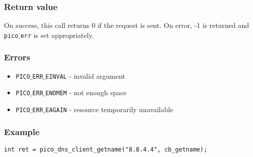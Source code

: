 \subsubsection*{Return value}
On success, this call returns 0 if the request is sent.
On error, -1 is returned and \texttt{pico$\_$err} is set appropriately.

\subsubsection*{Errors}
\begin{itemize}[noitemsep]
\item \texttt{PICO$\_$ERR$\_$EINVAL} - invalid argument
\item \texttt{PICO$\_$ERR$\_$ENOMEM} - not enough space
\item \texttt{PICO$\_$ERR$\_$EAGAIN} - resource temporarily unavailable
\end{itemize}

\subsubsection*{Example}
\begin{verbatim}
int ret = pico_dns_client_getname("8.8.4.4", cb_getname);
\end{verbatim}
